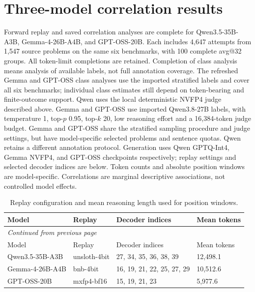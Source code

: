 \section{Three-model correlation results}
\label{sec:multimodel}
Forward replay and saved correlation analyses are complete for Qwen3.5-35B-A3B, Gemma-4-26B-A4B, and GPT-OSS-20B. Each includes 4,647 attempts from 1,547 source problems on the same six benchmarks, with 100 complete avg@32 groups. All token-limit completions are retained. Completion of class analysis means analysis of available labels, not full annotation coverage. The refreshed Gemma and GPT-OSS class analyses use the imported stratified labels and cover all six benchmarks; individual class estimates still depend on token-bearing and finite-outcome support.
Qwen uses the local deterministic NVFP4 judge described above. Gemma and GPT-OSS use imported Qwen3.8-27B labels, with temperature 1, top-$p$ 0.95, top-$k$ 20, low reasoning effort and a 16,384-token judge budget. Gemma and GPT-OSS share the stratified sampling procedure and judge settings, but have model-specific selected problems and sentence quotas. Qwen retains a different annotation protocol. Generation uses Qwen GPTQ-Int4, Gemma NVFP4, and GPT-OSS checkpoints respectively; replay settings and selected decoder indices are below. Token counts and absolute position windows are model-specific. Correlations are marginal descriptive associations, not controlled model effects.
\begingroup\scriptsize\setlength{\tabcolsep}{4pt}
\begin{longtable}{@{}llll@{}}
\caption{Replay configuration and mean reasoning length used for position windows.}\label{tab:multi-protocol}\\
\toprule
Model & Replay & Decoder indices & Mean tokens \\
\midrule\endfirsthead
\multicolumn{4}{l}{\textit{Continued from previous page}}\\
\toprule
Model & Replay & Decoder indices & Mean tokens \\
\midrule\endhead
\bottomrule\endfoot
Qwen3.5-35B-A3B & unsloth-4bit & 27, 34, 35, 36, 38, 39 & 12,498.1 \\
Gemma-4-26B-A4B & bnb-4bit & 16, 19, 21, 22, 25, 27, 29 & 10,512.6 \\
GPT-OSS-20B & mxfp4-bf16 & 15, 19, 21, 23 & 5,977.6 \\
\end{longtable}\endgroup


